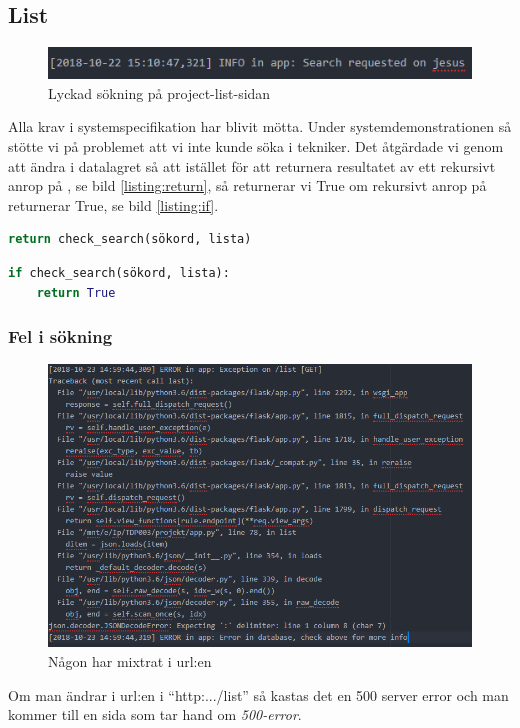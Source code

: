 \documentclass{TDP003mall}
\begin{document}
\subsection{List}
\begin{figure}[H]
    \centering
    \includegraphics[width=\linewidth]{list.png}
    \caption{Lyckad sökning på project-list-sidan}
    \label{fig:list}
\end{figure}
Alla krav i systemspecifikation har blivit mötta.
Under systemdemonstrationen så stötte vi på problemet att vi inte kunde söka i tekniker.
Det åtgärdade vi genom att ändra i datalagret så att istället för att returnera resultatet av ett
rekursivt anrop på , se bild \ref{listing:return}, så returnerar vi True om rekursivt anrop på  returnerar True, se bild \ref{listing:if}.
\begin{lstlisting}[caption={retur av rekursivt anrop}, label={listing:return}, language={Python}]
return check_search(sökord, lista)
\end{lstlisting}

\begin{lstlisting}[caption={Retur True om check\_search()}, label={listing:if}, language={Python}]
if check_search(sökord, lista):
    return True
\end{lstlisting}

\subsubsection{Fel i sökning}
\label{sec:nodb}
\begin{figure}[H]
    \centering
    \includegraphics[width=\linewidth]{searchrip.png}
    \caption{Någon har mixtrat i url:en}
    \label{fig:search-error}
\end{figure}
Om man ändrar i url:en i \enquote{http:.../list} så kastas det en 500 server error och man kommer till en sida som tar hand om \textit{500-error}. 
\end{document}
